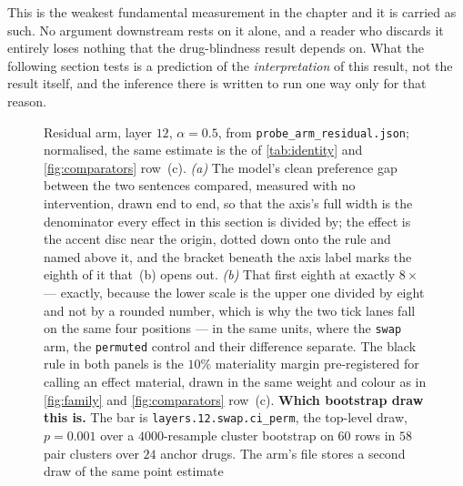 \begin{scopelimit}
This is the weakest fundamental measurement in the chapter and it is carried as
such. No argument downstream rests on it alone, and a reader who discards it
entirely loses nothing that the drug-blindness result depends on. What the
following section tests is a prediction of the \emph{interpretation} of this
result, not the result itself, and the inference there is written to run one way
only for that reason.
\end{scopelimit}

\begin{figure}[htbp]
\begin{fullwidth}\raggedright

\caption[The effect and its gap]{
Residual arm, layer $12$, $\alpha = 0.5$, from
\texttt{probe\_arm\_residual.json}; normalised, the same estimate is the
 of \cref{tab:identity} and
\cref{fig:comparators} row~(c). \emph{(a)} The model's clean preference gap
between the two sentences compared, measured with no intervention, drawn end to
end, so that the axis's full width is the denominator every effect in this
section is divided by; the effect is the accent disc near the origin, dotted
down onto the rule and named above it, and the bracket beneath the axis label
marks the eighth of it that~(b) opens out. \emph{(b)} That first eighth at
exactly $8\times$ --- exactly, because the lower scale is the upper one divided
by eight and not by a rounded number, which is why the two tick lanes fall on
the same four positions --- in the same units, where the \texttt{swap} arm, the
\texttt{permuted} control and their difference separate. The black rule in both
panels is the $10\%$ materiality margin pre-registered for calling an effect
material, drawn in the same weight and colour as in \cref{fig:family} and
\cref{fig:comparators} row~(c). \textbf{Which bootstrap draw this is.} The bar
is \texttt{layers.12.swap.ci\_perm}, the top-level draw, $p = 0.001$ over a
$4000$-resample cluster bootstrap on $60$ rows in $58$ pair clusters over $24$
anchor drugs. The arm's file stores a second draw of the same point estimate
}
\end{fullwidth}
\end{figure}
